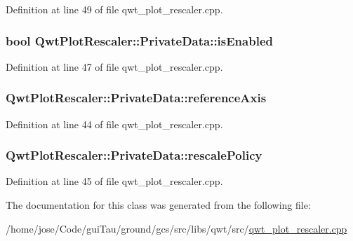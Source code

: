 Definition at line 49 of file qwt\-\_\-plot\-\_\-rescaler.\-cpp.

\hypertarget{class_qwt_plot_rescaler_1_1_private_data_a1adbb4d6ca8c4a70525cfb6a22720eb1}{
\subsubsection[{is\-Enabled}]{\setlength{\rightskip}{0pt plus 5cm}bool Qwt\-Plot\-Rescaler\-::\-Private\-Data\-::is\-Enabled}}\label{class_qwt_plot_rescaler_1_1_private_data_a1adbb4d6ca8c4a70525cfb6a22720eb1}


Definition at line 47 of file qwt\-\_\-plot\-\_\-rescaler.\-cpp.

\hypertarget{class_qwt_plot_rescaler_1_1_private_data_a8585285d0ad765d886741604a3ebeffa}{
\subsubsection[{reference\-Axis}]{ Qwt\-Plot\-Rescaler\-::\-Private\-Data\-::reference\-Axis}}\label{class_qwt_plot_rescaler_1_1_private_data_a8585285d0ad765d886741604a3ebeffa}


Definition at line 44 of file qwt\-\_\-plot\-\_\-rescaler.\-cpp.

\hypertarget{class_qwt_plot_rescaler_1_1_private_data_aee04aa4fd66cf5505f87789f1c6f0d9a}{
\subsubsection[{rescale\-Policy}]{ Qwt\-Plot\-Rescaler\-::\-Private\-Data\-::rescale\-Policy}}\label{class_qwt_plot_rescaler_1_1_private_data_aee04aa4fd66cf5505f87789f1c6f0d9a}


Definition at line 45 of file qwt\-\_\-plot\-\_\-rescaler.\-cpp.



The documentation for this class was generated from the following file\-:\begin{DoxyCompactItemize}
\item 
/home/jose/\-Code/gui\-Tau/ground/gcs/src/libs/qwt/src/\hyperlink{qwt__plot__rescaler_8cpp}{qwt\-\_\-plot\-\_\-rescaler.\-cpp}\end{DoxyCompactItemize}
